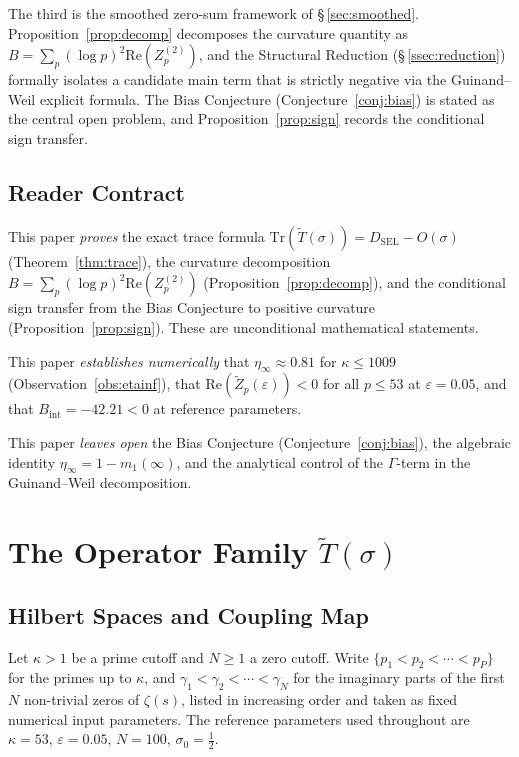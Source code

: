 \documentclass[11pt]{article}
\newcommand{\Tt}{\widetilde{T}}
\newcommand{\Zt}{\widetilde{Z}}
\newcommand{\DSEL}{D_{\mathrm{SEL}}}
\begin{document}
The third is the smoothed zero-sum framework of \S\,\ref{sec:smoothed}.
Proposition~\ref{prop:decomp} decomposes the curvature quantity as
$B = \sum_p(\log p)^2\allowbreak\mathrm{Re}(Z_p^{(2)})$,
and the Structural Reduction (\S\,\ref{ssec:reduction})
formally isolates a candidate main term that is strictly negative
via the Guinand--Weil explicit formula.
The Bias Conjecture (Conjecture~\ref{conj:bias}) is stated as the
central open problem, and Proposition~\ref{prop:sign} records the
conditional sign transfer.

\subsection{Reader Contract}

This paper \emph{proves} the exact trace formula
$\mathrm{Tr}(\Tt(\sigma)) = \DSEL - O(\sigma)$ (Theorem~\ref{thm:trace}),
the curvature decomposition
$B = \sum_p(\log p)^2\mathrm{Re}(Z_p^{(2)})$
(Proposition~\ref{prop:decomp}),
and the conditional sign transfer from the Bias Conjecture to
positive curvature (Proposition~\ref{prop:sign}).
These are unconditional mathematical statements.

This paper \emph{establishes numerically} that
$\eta_\infty\approx 0.81$ for $\kappa\leq 1009$
(Observation~\ref{obs:etainf}),
that $\mathrm{Re}(\Zt_p(\varepsilon))<0$ for all $p\leq 53$
at $\varepsilon=0.05$, and that
$B_{\mathrm{int}} = -42.21 < 0$ at reference parameters.

This paper \emph{leaves open} the Bias Conjecture
(Conjecture~\ref{conj:bias}), the algebraic identity
$\eta_\infty = 1-m_1(\infty)$, and the analytical control
of the $\Gamma$-term in the Guinand--Weil decomposition.

\section{The Operator Family \texorpdfstring{$\Tt(\sigma)$}{T-tilde(sigma)}}
\label{sec:ops}

\subsection{Hilbert Spaces and Coupling Map}

Let $\kappa>1$ be a prime cutoff and $N\geq 1$ a zero cutoff.
Write $\{p_1<p_2<\cdots<p_P\}$ for the primes up to $\kappa$,
and $\gamma_1<\gamma_2<\cdots<\gamma_N$ for the imaginary parts
of the first $N$ non-trivial zeros of $\zeta(s)$, listed in
increasing order and taken as fixed numerical input parameters.
The reference parameters used throughout are
$\kappa=53$, $\varepsilon=0.05$, $N=100$, $\sigma_0=\tfrac{1}{2}$.
\end{document}
